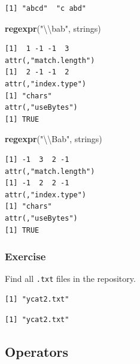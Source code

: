 \documentclass[]{book}
\newenvironment{Shaded}{\begin{snugshade}}{\end{snugshade}}
\newcommand{\CharTok}[1]{\textcolor[rgb]{0.31,0.60,0.02}{#1}}
\newcommand{\KeywordTok}[1]{\textcolor[rgb]{0.13,0.29,0.53}{\textbf{#1}}}
\newcommand{\NormalTok}[1]{#1}
\newcommand{\StringTok}[1]{\textcolor[rgb]{0.31,0.60,0.02}{#1}}
\theoremstyle{definition}
\theoremstyle{definition}
\theoremstyle{definition}
\theoremstyle{remark}
\begin{document}
\begin{verbatim}
[1] "abcd"  "c abd"
\end{verbatim}

\begin{Shaded}
\begin{Highlighting}[]
\KeywordTok{regexpr}\NormalTok{(}\StringTok{"}\CharTok{\textbackslash{}\textbackslash{}}\StringTok{bab"}\NormalTok{, strings)}
\end{Highlighting}
\end{Shaded}

\begin{verbatim}
[1]  1 -1 -1  3
attr(,"match.length")
[1]  2 -1 -1  2
attr(,"index.type")
[1] "chars"
attr(,"useBytes")
[1] TRUE
\end{verbatim}

\begin{Shaded}
\begin{Highlighting}[]
\KeywordTok{regexpr}\NormalTok{(}\StringTok{"}\CharTok{\textbackslash{}\textbackslash{}}\StringTok{Bab"}\NormalTok{, strings)}
\end{Highlighting}
\end{Shaded}

\begin{verbatim}
[1] -1  3  2 -1
attr(,"match.length")
[1] -1  2  2 -1
attr(,"index.type")
[1] "chars"
attr(,"useBytes")
[1] TRUE
\end{verbatim}

\hypertarget{exercise-1}{%
\subsubsection{Exercise}\label{exercise-1}}

Find all \texttt{.txt} files in the repository.

\begin{verbatim}
[1] "ycat2.txt"
\end{verbatim}

\begin{verbatim}
[1] "ycat2.txt"
\end{verbatim}

\hypertarget{operators}{%
\subsection{Operators}\label{operators}}
\end{document}
